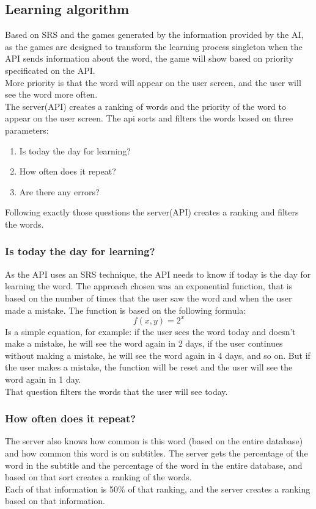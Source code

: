\documentclass[12pt]{article}
\begin{document}
\subsection{Learning algorithm}
Based on SRS and the games generated by the information provided by the AI, as the games are designed to transform the learning process singleton when the API sends information about the word, the game will show based on priority specificated on the API. \\
More priority is that the word will appear on the user screen, and the user will see the word more often. \\
The server(API) creates a ranking of words and the priority of the word to appear on the user screen. The api sorts and filters the words based on three parameters: 
\begin{enumerate}
  \item Is today the day for learning?
  \item How often does it repeat? 
  \item Are there any errors?
\end{enumerate}
Following exactly those questions the server(API) creates a ranking and filters the words. 
\subsubsection{Is today the day for learning?}
As the API uses an SRS technique, the API needs to know if today is the day for learning the word. The approach chosen was an exponential function, that is based on the number of times that the user saw the word and when the user made a mistake. The function is based on the following formula:
\begin{equation}
  \label{eq:1}
  f(x, y) = 2^x 
\end{equation}
Is a simple equation, for example: if the user sees the word today and doesn't make a mistake, he will see the word again in 2 days, if the user continues without making a mistake, he will see the word again in 4 days, and so on. But if the user makes a mistake, the function will be reset and the user will see the word again in 1 day. \\
That question filters the words that the user will see today. 
\subsubsection{How often does it repeat?}
The server also knows how common is this word (based on the entire database) and how common this word is on subtitles. The server gets the percentage of the word in the subtitle and the percentage of the word in the entire database, and based on that sort creates a ranking of the words. \\
Each of that information is 50\% of that ranking, and the server creates a ranking based on that information. 
\end{document}

